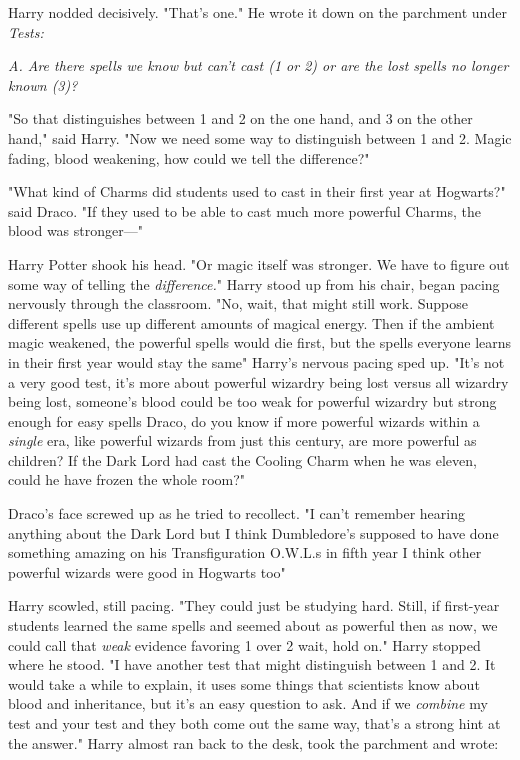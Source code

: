 Harry nodded decisively. "That's one." He wrote it down on the parchment under
\emph{Tests:}

\emph{A. Are there spells we know but can't cast (1 or 2) or are the lost
spells no longer known (3)?}

"So that distinguishes between 1 and 2 on the one hand, and 3 on the other
hand," said Harry. "Now we need some way to distinguish between 1 and 2. Magic
fading, blood weakening, how could we tell the difference?"

"What kind of Charms did students used to cast in their first year at
Hogwarts?" said Draco. "If they used to be able to cast much more powerful
Charms, the blood was stronger\mbox{---}"

Harry Potter shook his head. "Or magic itself was stronger. We have to figure
out some way of telling the \emph{difference.}" Harry stood up from his chair,
began pacing nervously through the classroom. "No, wait, that might still work.
Suppose different spells use up different amounts of magical energy. Then if
the ambient magic weakened, the powerful spells would die first, but the spells
everyone learns in their first year would stay the same{\el}" Harry's
nervous pacing sped up. "It's not a very good test, it's more about powerful
wizardry being lost versus all wizardry being lost, someone's blood could be
too weak for powerful wizardry but strong enough for easy spells{\el} Draco,
do you know if more powerful wizards within a \emph{single} era, like powerful
wizards from just this century, are more powerful as children? If the Dark Lord
had cast the Cooling Charm when he was eleven, could he have frozen the whole
room?"

Draco's face screwed up as he tried to recollect. "I can't remember hearing
anything about the Dark Lord but I think Dumbledore's supposed to have done
something amazing on his Transfiguration O.W.L.s in fifth year{\el} I think
other powerful wizards were good in Hogwarts too{\el}"

Harry scowled, still pacing. "They could just be studying hard. Still, if
first-year students learned the same spells and seemed about as powerful then
as now, we could call that \emph{weak} evidence favoring 1 over 2{\el} wait,
hold on." Harry stopped where he stood. "I have another test that might
distinguish between 1 and 2. It would take a while to explain, it uses some
things that scientists know about blood and inheritance, but it's an easy
question to ask. And if we \emph{combine} my test and your test and they both
come out the same way, that's a strong hint at the answer." Harry almost ran
back to the desk, took the parchment and wrote:


